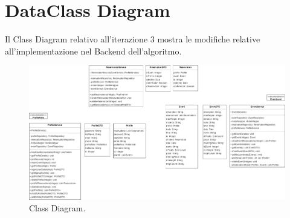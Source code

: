 \section{DataClass Diagram} 
Il Class Diagram relativo all'iterazione 3 mostra le modifiche relative all'implementazione nel Backend dell'algoritmo.
\begin{figure}[h!]
	\centering
	\includegraphics[width=0.8\linewidth]{Iterazione 3/images/class.drawio.png}
	\caption{Class Diagram.}
	\label{fig:ClassDiagramIt3}
\end{figure}
